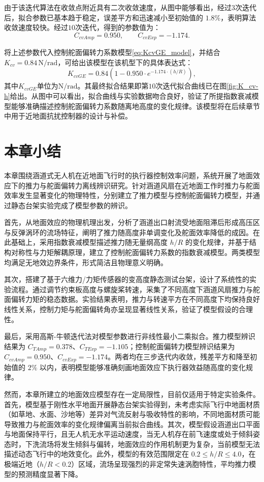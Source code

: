 由于该迭代算法在收敛点附近具有二次收敛速度，从图中能够看出，经过3次迭代后，拟合参数已基本趋于稳定，误差平方和迅速减小至初始值的 $1.8\%$，表明算法收敛速度较快。经过$10$次迭代，得到的参数值为：
\begin{equation}
    C_{cvAmp} = 0.950,\qquad C_{cvExp} = -1.174.
\end{equation}

将上述参数代入控制舵面偏转力系数模型\eqref{eq:KcvGE_model}，并结合$K_{cv} = 0.84\, \mathrm{N/rad}$，可给出该模型在该机型下的具体表达式：
\begin{equation}
    K_{cvGE} = 0.84\left(1 - 0.950 \cdot e^{-1.174 \cdot (h/R)}\right),
\end{equation}
其中$K_{cvGE}$单位为$\mathrm{N/rad}$。其最终拟合结果即第$10$次迭代拟合曲线已在图\ref{fig:K_cv-h}给出。从图中可以看出，拟合曲线与实验数据吻合良好，验证了所提指数衰减模型能够准确描述控制舵面偏转力系数随离地高度的变化规律。该模型将在后续章节中用于近地面抗扰控制器的设计与补偿。

\section{本章小结}
本章围绕涵道式无人机在近地面飞行时的执行器控制效率问题，系统开展了地面效应下的推力与舵面偏转力离线辨识研究。针对涵道风扇在近地面工作时推力与舵面效率发生显著变化的物理特性，分别建立了推力模型与控制舵面偏转力模型，并通过静态台架实验完成了模型参数的辨识。

首先，从地面效应的物理机理出发，分析了涵道出口射流受地面阻滞后形成高压区与反弹涡环的流场特征，阐明了推力随高度非单调变化及舵面效率降低的成因。在此基础上，采用指数衰减模型描述推力随无量纲高度 \(h/R\) 的变化规律，并基于结构对称性与力矩解耦原理，建立了控制舵面偏转力系数的指数衰减模型。两类模型均满足无地效边界条件，形式简洁且物理意义明确。

其次，搭建了基于六维力/力矩传感器的变高度静态测试台架，设计了系统性的实验流程。通过调节约束板高度与螺旋桨转速，采集了不同高度下涵道风扇推力与舵面偏转力矩的稳态数据。实验结果表明，推力与转速平方在不同高度下均保持良好线性关系，控制力矩与舵面偏转角亦呈现显著线性关系，验证了模型假设的合理性。

最后，采用高斯-牛顿迭代法对模型参数进行非线性最小二乘拟合。推力模型辨识结果为 \(C_{TAmp} = 0.378\)、\(C_{TExp} = -1.105\)；控制舵面偏转力模型辨识结果为 \(C_{cvAmp} = 0.950\)、\(C_{cvExp} = -1.174\)。两者均在三步迭代内收敛，残差平方和降至初始值的 \(2\%\) 以内，表明模型能够准确刻画地面效应下执行器效益随高度的变化规律。

然而，本章所建立的地面效应模型存在一定局限性，目前仅适用于特定实验条件。首先，模型基于刚性水平地面开展静态台架实验得到，未考虑实际飞行中地面材质（如草地、水面、沙地等）差异对气流反射与吸收特性的影响，不同地面材质可能导致推力与舵面效率的变化规律偏离当前拟合曲线。其次，模型假设涵道出口平面与地面保持平行，且无人机无水平运动速度，当无人机存在前飞速度或处于倾斜姿态时，下洗流场将发生倾斜与偏转，地面效应的作用机制更为复杂，当前模型无法描述动态飞行中的地效变化。此外，模型的有效范围限定在 \(0.2 \leq h/R \leq 4.0\)，在极端近地（\(h/R < 0.2\)）区域，流场呈现强烈的非定常失速涡胞特性，平均推力模型的预测精度显著下降。

